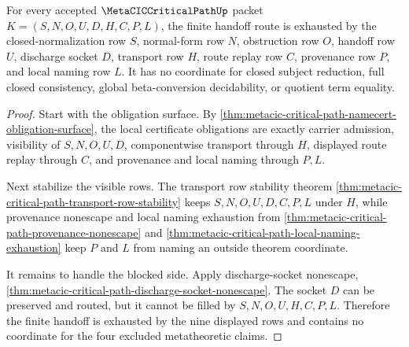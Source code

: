 \begin{theorem}
\label{thm:metacic-critical-path-handoff-exhaustion}
For every accepted $\MetaCICCriticalPathUp$ packet $K=(S,N,O,U,D,H,C,P,L)$, the finite handoff route is exhausted by the closed-normalization row $S$, normal-form row $N$, obstruction row $O$, handoff row $U$, discharge socket $D$, transport row $H$, route replay row $C$, provenance row $P$, and local naming row $L$. It has no coordinate for closed subject reduction, full closed consistency, global beta-conversion decidability, or quotient term equality.
\end{theorem}
\begin{proof}
Start with the obligation surface. By \autoref{thm:metacic-critical-path-namecert-obligation-surface}, the local certificate obligations are exactly carrier admission, visibility of $S,N,O,U,D$, componentwise transport through $H$, displayed route replay through $C$, and provenance and local naming through $P,L$.

Next stabilize the visible rows. The transport row stability theorem \autoref{thm:metacic-critical-path-transport-row-stability} keeps $S,N,O,U,D,C,P,L$ under $H$, while provenance nonescape and local naming exhaustion from \autoref{thm:metacic-critical-path-provenance-nonescape} and \autoref{thm:metacic-critical-path-local-naming-exhaustion} keep $P$ and $L$ from naming an outside theorem coordinate.

It remains to handle the blocked side. Apply discharge-socket nonescape, \autoref{thm:metacic-critical-path-discharge-socket-nonescape}. The socket $D$ can be preserved and routed, but it cannot be filled by $S,N,O,U,H,C,P,L$. Therefore the finite handoff is exhausted by the nine displayed rows and contains no coordinate for the four excluded metatheoretic claims.
\end{proof}

